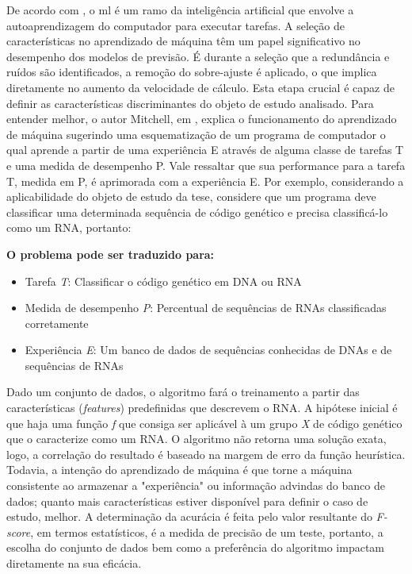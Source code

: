 De acordo com \cite{ml-approach}, o \ac{ml} é um ramo da inteligência artificial que envolve a autoaprendizagem do computador para executar tarefas. A seleção de características no aprendizado de máquina têm um papel significativo no desempenho dos modelos de previsão. É durante a seleção que a redundância e ruídos são identificados, a remoção do sobre-ajuste é aplicado, o que implica diretamente no aumento da velocidade de cálculo. Esta etapa crucial é capaz de definir as características discriminantes do objeto de estudo analisado.  Para entender melhor, o autor Mitchell, em \cite{ml-book}, explica o funcionamento do aprendizado de máquina sugerindo uma esquematização de um programa de computador o qual aprende a partir de uma experiência E através de alguma classe de tarefas T e uma medida de desempenho P. Vale ressaltar que sua performance para a tarefa T, medida em P, é aprimorada com a experiência E. Por exemplo, considerando a aplicabilidade do objeto de estudo da tese, considere que um programa deve classificar uma determinada sequência de código genético e precisa classificá-lo como um RNA, portanto:

\textbf{O problema pode ser traduzido para:}
\begin{itemize}
    \item Tarefa \textit{T}: Classificar o código genético em DNA ou RNA
    \item Medida de desempenho \textit{P}: Percentual de sequências de RNAs classificadas corretamente
    \item Experiência \textit{E}: Um banco de dados de sequências conhecidas de DNAs e de
sequências de RNAs
\end{itemize}

Dado um conjunto de dados, o algoritmo fará o treinamento a partir das características (\textit{features}) predefinidas que descrevem o RNA. A hipótese inicial é que haja uma função \textit{f} que consiga ser aplicável à um grupo \textit{X} de código genético que o caracterize como um RNA. O algoritmo não retorna uma solução exata, logo, a correlação do resultado é baseado na margem de erro da função heurística. Todavia, a intenção do aprendizado de máquina é que torne a máquina consistente ao armazenar a "experiência" ou informação advindas do banco de dados; quanto mais características estiver disponível para definir o caso de estudo, melhor. A determinação da acurácia é feita pelo valor resultante do \textit{F-score}, em termos estatísticos, é a medida de precisão de um teste, portanto, a escolha do conjunto de dados bem como a preferência do algoritmo impactam diretamente na sua eficácia. \cite{ml-intro}


